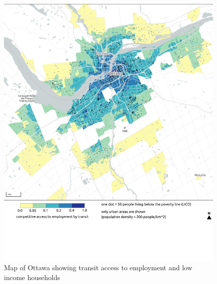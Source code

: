 \documentclass[11 pt, letterpaper]{article}
\begin{document}
{\begin{figure}[H]
	\vspace{5mm}
	\caption{Map of Ottawa showing transit access to employment and low income households} 
	\label{a_van}
	\centerline{\includegraphics[width=6.5in]{figures/appendix_maps/a_ott.png}}
\end{figure}

}
\end{document}
